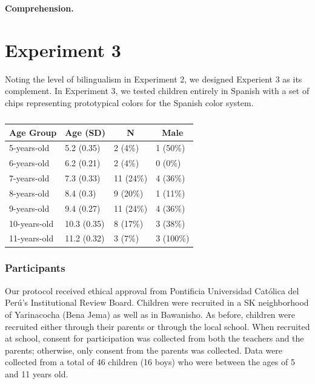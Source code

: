 \documentclass[floatsintext,man]{apa6}
\theoremstyle{definition}
\theoremstyle{definition}
\theoremstyle{definition}
\theoremstyle{remark}
\begin{document}
\textbf{Comprehension.}

\section{Experiment 3}\label{experiment-3}

Noting the level of bilingualism in Experiment 2, we designed Experient
3 as its complement. In Experiment 3, we tested children entirely in
Spanish with a set of chips representing prototypical colors for the
Spanish color system.

\begin{table}[tbp]
\begin{center}
\begin{threeparttable}
\caption{\label{tab:unnamed-chunk-4}}
\begin{tabular}{llll}
\toprule
Age Group & \multicolumn{1}{c}{Age (SD)} & \multicolumn{1}{c}{N} & \multicolumn{1}{c}{Male}\\
\midrule
5-years-old & 5.2 (0.35) & 2 (4\%) & 1 (50\%)\\
6-years-old & 6.2 (0.21) & 2 (4\%) & 0 (0\%)\\
7-years-old & 7.3 (0.33) & 11 (24\%) & 4 (36\%)\\
8-years-old & 8.4 (0.3) & 9 (20\%) & 1 (11\%)\\
9-years-old & 9.4 (0.27) & 11 (24\%) & 4 (36\%)\\
10-years-old & 10.3 (0.35) & 8 (17\%) & 3 (38\%)\\
11-years-old & 11.2 (0.32) & 3 (7\%) & 3 (100\%)\\
\bottomrule
\end{tabular}
\end{threeparttable}
\end{center}
\end{table}

\subsubsection{Participants}\label{participants-2}

Our protocol received ethical approval from Pontificia Universidad
Católica del Perú's Institutional Review Board. Children were recruited
in a SK neighborhood of Yarinacocha (Bena Jema) as well as in Bawanisho.
As before, children were recruited either through their parents or
through the local school. When recruited at school, consent for
participation was collected from both the teachers and the parents;
otherwise, only consent from the parents was collected. Data were
collected from a total of 46 children (16 boys) who were between the
ages of 5 and 11 years old.
\end{document}
